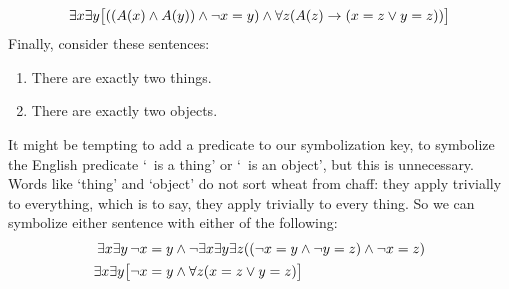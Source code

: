 $$\exists x\exists y\bigl[((A(x) \wedge A(y)) \wedge \neg x = y) \wedge \forall z(A(z) \rightarrow ( x= z \vee y = z))\bigr]$$
Finally, consider these sentences:
\begin{enumerate}
\item\label{exactly2things} There are exactly two things.
\item\label{exactly2objects} There are exactly two objects.
\end{enumerate}
It might be tempting to add a predicate to our symbolization key, to symbolize the English predicate `\blank\ is a thing' or `\blank\ is an object', but this is unnecessary. Words like `thing' and `object' do not sort wheat from chaff: they apply trivially to everything, which is to say, they apply trivially to every thing. So we can symbolize either sentence with either of the following:
	\begin{align*}
		\exists x \exists y\,\neg x = y & \wedge  \neg \exists x \exists y \exists z ((\neg x = y \wedge \neg y = z) \wedge \neg x = z) \\
		\exists x \exists y \bigl[\neg x = y & \wedge \forall z(x=z \vee y = z)\bigr]
	\end{align*}

\practiceproblems


